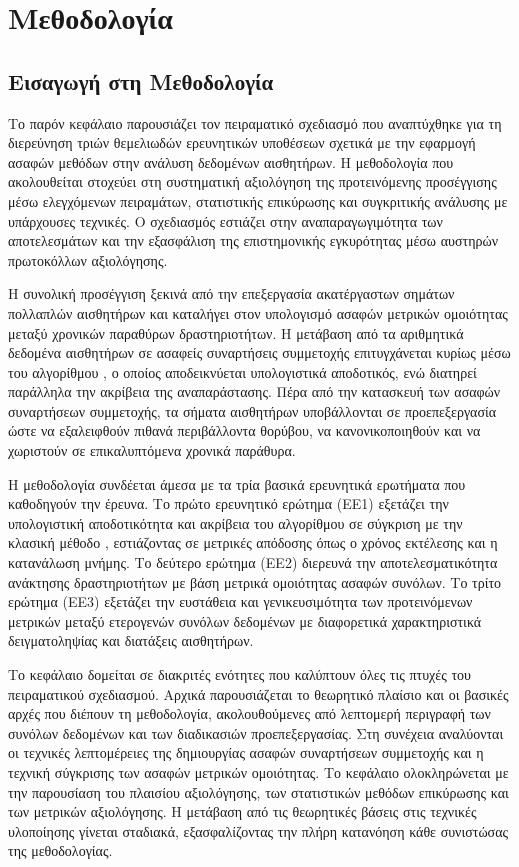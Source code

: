\chapter{Μεθοδολογία}

\section{Εισαγωγή στη Μεθοδολογία}

Το παρόν κεφάλαιο παρουσιάζει τον πειραματικό σχεδιασμό που αναπτύχθηκε για τη διερεύνηση τριών θεμελιωδών ερευνητικών υποθέσεων σχετικά με την εφαρμογή ασαφών μεθόδων στην ανάλυση δεδομένων αισθητήρων.
Η μεθοδολογία που ακολουθείται στοχεύει στη συστηματική αξιολόγηση της προτεινόμενης προσέγγισης μέσω ελεγχόμενων πειραμάτων, στατιστικής επικύρωσης και συγκριτικής ανάλυσης με υπάρχουσες τεχνικές.
Ο σχεδιασμός εστιάζει στην αναπαραγωγιμότητα των αποτελεσμάτων και την εξασφάλιση της επιστημονικής εγκυρότητας μέσω αυστηρών πρωτοκόλλων αξιολόγησης.

Η συνολική προσέγγιση ξεκινά από την επεξεργασία ακατέργαστων σημάτων πολλαπλών αισθητήρων και καταλήγει στον υπολογισμό ασαφών μετρικών ομοιότητας μεταξύ χρονικών παραθύρων δραστηριοτήτων.
Η μετάβαση από τα αριθμητικά δεδομένα αισθητήρων σε ασαφείς συναρτήσεις συμμετοχής επιτυγχάνεται κυρίως μέσω του αλγορίθμου \cite{Truong2012}, ο οποίος αποδεικνύεται υπολογιστικά αποδοτικός, ενώ διατηρεί παράλληλα την ακρίβεια της αναπαράστασης.
Πέρα από την κατασκευή των ασαφών συναρτήσεων συμμετοχής, τα σήματα αισθητήρων υποβάλλονται σε προεπεξεργασία ώστε να εξαλειφθούν πιθανά περιβάλλοντα θορύβου, να κανονικοποιηθούν και να χωριστούν σε επικαλυπτόμενα χρονικά παράθυρα.

Η μεθοδολογία συνδέεται άμεσα με τα τρία βασικά ερευνητικά ερωτήματα που καθοδηγούν την έρευνα.
Το πρώτο ερευνητικό ερώτημα (ΕΕ1) εξετάζει την υπολογιστική αποδοτικότητα και ακρίβεια του αλγορίθμου  σε σύγκριση με την κλασική μέθοδο , εστιάζοντας σε μετρικές απόδοσης όπως ο χρόνος εκτέλεσης και η κατανάλωση μνήμης.
Το δεύτερο ερώτημα (ΕΕ2) διερευνά την αποτελεσματικότητα ανάκτησης δραστηριοτήτων με βάση μετρικά ομοιότητας ασαφών συνόλων.
Το τρίτο ερώτημα (ΕΕ3) εξετάζει την ευστάθεια και γενικευσιμότητα των προτεινόμενων μετρικών μεταξύ ετερογενών συνόλων δεδομένων με διαφορετικά χαρακτηριστικά δειγματοληψίας και διατάξεις αισθητήρων.

Το κεφάλαιο δομείται σε διακριτές ενότητες που καλύπτουν όλες τις πτυχές του πειραματικού σχεδιασμού.
Αρχικά παρουσιάζεται το θεωρητικό πλαίσιο και οι βασικές αρχές που διέπουν τη μεθοδολογία, ακολουθούμενες από λεπτομερή περιγραφή των συνόλων δεδομένων και των διαδικασιών προεπεξεργασίας.
Στη συνέχεια αναλύονται οι τεχνικές λεπτομέρειες της δημιουργίας ασαφών συναρτήσεων συμμετοχής και η τεχνική σύγκρισης των ασαφών μετρικών ομοιότητας.
Το κεφάλαιο ολοκληρώνεται με την παρουσίαση του πλαισίου αξιολόγησης, των στατιστικών μεθόδων επικύρωσης και των μετρικών αξιολόγησης.
Η μετάβαση από τις θεωρητικές βάσεις στις τεχνικές υλοποίησης γίνεται σταδιακά, εξασφαλίζοντας την πλήρη κατανόηση κάθε συνιστώσας της μεθοδολογίας.

